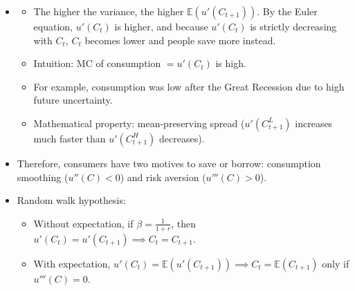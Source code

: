 \documentclass[notitlepage]{article}
\begin{document}
\begin{figure}[h]%
    \centering
    \resizebox{0.48\textwidth}{!}{}%
    \hfill
    \resizebox{0.48\textwidth}{!}{}%
\end{figure}
\begin{itemize}
\item[]
\begin{itemize}
\item The higher the variance, the higher $\mathbb{E}(u'(C_{t+1}))$. By the Euler equation, $u'(C_t)$ is higher, and because $u'(C_t)$ is strictly decreasing with $C_t$, $C_t$ becomes lower and people save more instead.
\item Intuition: MC of consumption $= u'(C_t)$ is high.
\item For example, consumption was low after the Great Recession due to high future uncertainty.
\item Mathematical property: mean-preserving spread ($u'(C_{t+1}^L)$ increases much faster than $u'(C_{t+1}^H)$ decreases).
\end{itemize}

\item Therefore, consumers have two motives to save or borrow: consumption smoothing ($u''(C)<0$) and risk aversion ($u'''(C)>0$).

\item Random walk hypothesis:
\begin{itemize}
\item Without expectation, if $\beta = \frac{1}{1+r}$, then $u'(C_t) = u'(C_{t+1}) \implies C_t = C_{t+1}$.
\item With expectation, $u'(C_t) = \mathbb{E}(u'(C_{t+1})) \implies C_t = \mathbb{E}(C_{t+1})$ only if $u'''(C) = 0$.
\end{itemize}
\end{itemize}
\end{document}

